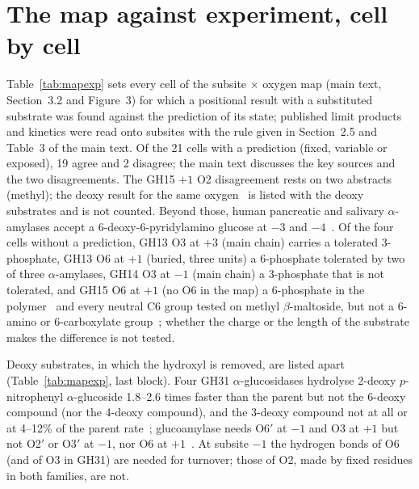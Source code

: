 \documentclass[preprint,12pt]{elsarticle}
\begin{document}
\section{The map against experiment, cell by cell}\label{sec:simapexp}
Table~\ref{tab:mapexp} sets every cell of the subsite $\times$ oxygen map (main text, Section~3.2 and
Figure~3) for which a positional result with a substituted substrate was found against the prediction of
its state; published limit products and kinetics were read onto subsites with the rule given in
Section~2.5 and Table~3 of the main text. Of the 21 cells with a prediction (fixed, variable or exposed), 19 agree and
2 disagree;
the main text discusses the key sources and the two disagreements. The GH15 $+1$ O2 disagreement rests on two
abstracts (methyl); the deoxy result for the same oxygen~\citep{Bock1987} is listed with the deoxy substrates and is
not counted. Beyond those, human pancreatic and
salivary $\alpha$-amylases accept a 6-deoxy-6-pyridylamino glucose at $-3$ and $-4$~\citep{Omichi1988}.
Of the four cells without a prediction, GH13 O3 at $+3$ (main chain) carries a tolerated 3-phosphate, GH13
O6 at $+1$ (buried, three units) a 6-phosphate tolerated by two of three $\alpha$-amylases, GH14 O3 at $-1$
(main chain) a 3-phosphate that is not tolerated, and GH15 O6 at $+1$ (no O6 in the map) a 6-phosphate in
the polymer~\citep{Takeda1987} and every neutral C6 group tested on methyl $\beta$-maltoside, but not a
6-amino or 6-carboxylate group~\citep{Bock1988}; whether the charge or the length of the substrate makes
the difference is not tested.

Deoxy substrates, in which the hydroxyl is removed, are listed apart (Table~\ref{tab:mapexp}, last block).
Four GH31 $\alpha$-glucosidases hydrolyse 2-deoxy $p$-nitrophenyl $\alpha$-glucoside 1.8--2.6 times faster
than the parent but not the 6-deoxy compound (nor the 4-deoxy compound), and the 3-deoxy compound not at
all or at 4--12\% of the parent rate~\citep{Nishio2002}; glucoamylase needs O6$'$ at $-1$ and O3
at $+1$ but not O2$'$ or O3$'$ at $-1$, nor O6 at $+1$~\citep{Bock1987}. At subsite $-1$ the hydrogen bonds
of O6 (and of O3 in GH31) are needed for turnover; those of O2, made by fixed residues in both families, are
not.
\end{document}
